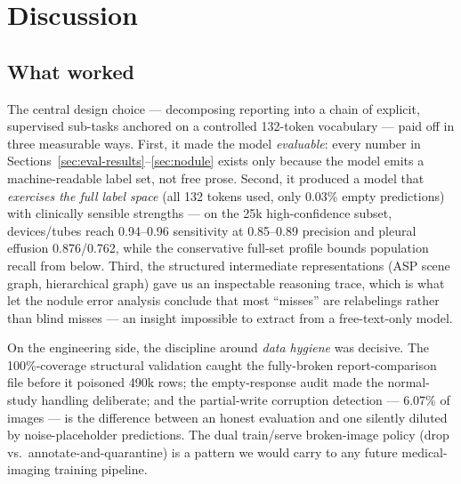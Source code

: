 \documentclass[11pt,a4paper]{article}
\begin{document}
\section{Discussion}
\label{sec:discussion}

\subsection{What worked}
The central design choice --- decomposing reporting into a chain of explicit, supervised sub-tasks anchored on a controlled 132-token vocabulary --- paid off in three measurable ways. First, it made the model \emph{evaluable}: every number in Sections~\ref{sec:eval-results}--\ref{sec:nodule} exists only because the model emits a machine-readable label set, not free prose. Second, it produced a model that \emph{exercises the full label space} (all 132 tokens used, only 0.03\% empty predictions) with clinically sensible strengths --- on the 25k high-confidence subset, devices/tubes reach 0.94--0.96 sensitivity at 0.85--0.89 precision and pleural effusion 0.876/0.762, while the conservative full-set profile bounds population recall from below. Third, the structured intermediate representations (ASP scene graph, hierarchical graph) gave us an inspectable reasoning trace, which is what let the nodule error analysis conclude that most ``misses'' are relabelings rather than blind misses --- an insight impossible to extract from a free-text-only model.

On the engineering side, the discipline around \emph{data hygiene} was decisive. The 100\%-coverage structural validation caught the fully-broken report-comparison file before it poisoned 490k rows; the empty-response audit made the normal-study handling deliberate; and the partial-write corruption detection --- 6.07\% of images --- is the difference between an honest evaluation and one silently diluted by noise-placeholder predictions. The dual train/serve broken-image policy (drop vs.\ annotate-and-quarantine) is a pattern we would carry to any future medical-imaging training pipeline.
\end{document}
